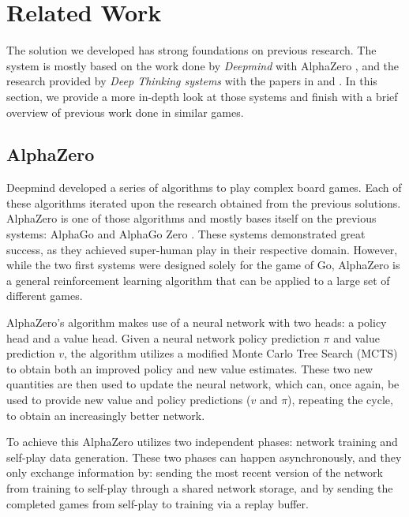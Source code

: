 \section{Related Work}

The solution we developed has strong foundations on previous research. The system is mostly based on the work done by \textit{Deepmind} with AlphaZero \cite{alphaZero}, and the research provided by \textit{Deep Thinking systems} with the papers in \cite{easy_to_hard} and \cite{deepthinking_2}. In this section, we provide a more in-depth look at those systems and finish with a brief overview of previous work done in similar games.

\subsection{AlphaZero}

Deepmind developed a series of algorithms to play complex board games. Each of these algorithms iterated upon the research obtained from the previous solutions. AlphaZero is one of those algorithms and mostly bases itself on the previous systems: AlphaGo \cite{alphago} and AlphaGo Zero \cite{alphago_zero}. These systems demonstrated great success, as they achieved super-human play in their respective domain. However, while the two first systems were designed solely for the game of Go, AlphaZero is a general reinforcement learning algorithm that can be applied to a large set of different games.

AlphaZero's algorithm makes use of a neural network with two heads: a policy head and a value head. Given a neural network policy prediction $\pi$ and value prediction $v$, the algorithm utilizes a modified Monte Carlo Tree Search (MCTS) to obtain both an improved policy and new value estimates. These two new quantities are then used to update the neural network, which can, once again, be used to provide new value and policy predictions ($v$ and $\pi$), repeating the cycle, to obtain an increasingly better network.

To achieve this AlphaZero utilizes two independent phases: network training and self-play data generation. These two phases can happen asynchronously, and they only exchange information by: sending the most recent version of the network from training to self-play through a shared network storage, and by sending the completed games from self-play to training via a replay buffer.

